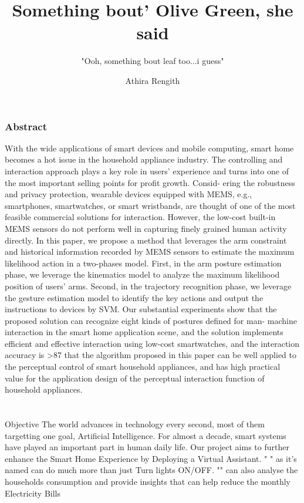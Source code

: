 \documentclass{beamer}
\title{Something bout' Olive Green, she said}
\subtitle{"Ooh, something bout leaf too...i guess"}
\author[]{Athira Rengith}
\begin{document}
	
\begin{frame}
\titlepage
\end{frame}

\section[Introduction]{}



\section[Abstract]{}
\begin{frame}[allowframebreaks]
\frametitle{Abstract}
With the wide applications of smart devices and mobile computing, smart home becomes
a hot issue in the household appliance industry. The controlling and interaction approach plays a key role
in users’ experience and turns into one of the most important selling points for profit growth. Consid-
ering the robustness and privacy protection, wearable devices equipped with MEMS, e.g., smartphones,
smartwatches, or smart wristbands, are thought of one of the most feasible commercial solutions for
interaction. However, the low-cost built-in MEMS sensors do not perform well in capturing finely grained
human activity directly. In this paper, we propose a method that leverages the arm constraint and historical
information recorded by MEMS sensors to estimate the maximum likelihood action in a two-phases model.
First, in the arm posture estimation phase, we leverage the kinematics model to analyze the maximum
likelihood position of users’ arms. Second, in the trajectory recognition phase, we leverage the gesture
estimation model to identify the key actions and output the instructions to devices by SVM. Our substantial
experiments show that the proposed solution can recognize eight kinds of postures defined for man-
machine interaction in the smart home application scene, and the solution implements efficient and effective
interaction using low-cost smartwatches, and the interaction accuracy is >87%
that the algorithm proposed in this paper can be well applied to the perceptual control of smart household
appliances, and has high practical value for the application design of the perceptual interaction function of
household appliances.

\end{frame}


\section[Objective]{ }
\begin{frame}{Objective}
\justifying \small 
The world advances in technology every second, most of them targetting one goal, Artificial Intelligence. For almost a decade, smart systems have played an important part in human daily life.  Our project aims to further enhance the Smart Home Experience by Deploying a Virtual Assistant. " " as it's named can do much more than just Turn lights ON/OFF. "" can also analyse the households consumption and provide insights that can help reduce the monthly Electricity Bills
\end{frame}
\end{document}

